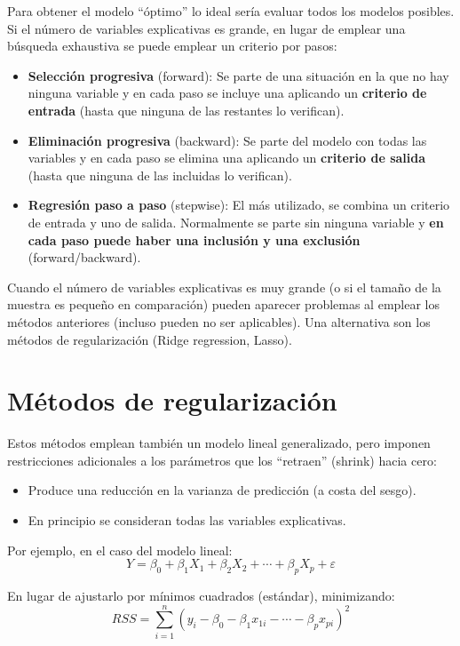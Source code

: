 \documentclass[]{book}
\begin{document}
Para obtener el modelo ``óptimo'' lo ideal sería evaluar todos los
modelos posibles. Si el número de variables explicativas es grande, en
lugar de emplear una búsqueda exhaustiva se puede emplear un criterio
por pasos:

\begin{itemize}
\item
  \textbf{Selección progresiva} (forward): Se parte de una situación en
  la que no hay ninguna variable y en cada paso se incluye una aplicando
  un \textbf{criterio de entrada} (hasta que ninguna de las restantes lo
  verifican).
\item
  \textbf{Eliminación progresiva} (backward): Se parte del modelo con
  todas las variables y en cada paso se elimina una aplicando un
  \textbf{criterio de salida} (hasta que ninguna de las incluidas lo
  verifican).
\item
  \textbf{Regresión paso a paso} (stepwise): El más utilizado, se
  combina un criterio de entrada y uno de salida. Normalmente se parte
  sin ninguna variable y \textbf{en cada paso puede haber una inclusión
  y una exclusión} (forward/backward).
\end{itemize}

Cuando el número de variables explicativas es muy grande (o si el tamaño
de la muestra es pequeño en comparación) pueden aparecer problemas al
emplear los métodos anteriores (incluso pueden no ser aplicables). Una
alternativa son los métodos de regularización (Ridge regression, Lasso).

\section{Métodos de
regularización}\label{muxe9todos-de-regularizaciuxf3n}

Estos métodos emplean también un modelo lineal generalizado, pero
imponen restricciones adicionales a los parámetros que los ``retraen''
(shrink) hacia cero:

\begin{itemize}
\item
  Produce una reducción en la varianza de predicción (a costa del
  sesgo).
\item
  En principio se consideran todas las variables explicativas.
\end{itemize}

Por ejemplo, en el caso del modelo lineal:
\[Y=\beta_{0}+\beta_{1}X_{1}+\beta_{2}X_{2}+\cdots+\beta_{p}X_{p}+\varepsilon\]

En lugar de ajustarlo por mínimos cuadrados (estándar), minimizando:
\[ RSS = \sum\limits_{i=1}^{n}\left(  y_{i} - \beta_0 - \beta_1 x_{1i} - \cdots - \beta_p x_{pi} \right)^{2}\]
\end{document}
